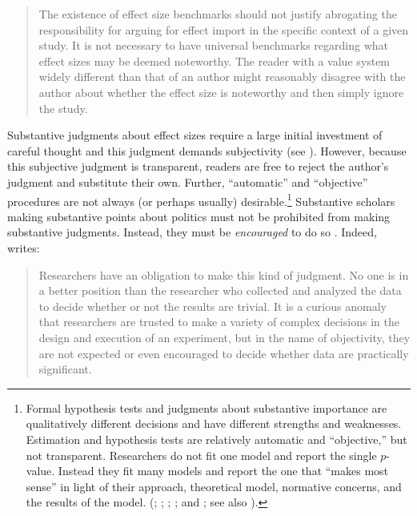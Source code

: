 \documentclass[12pt]{article}
\begin{document}
\begin{quote}
The existence of effect size benchmarks should not justify abrogating the responsibility for arguing for effect import in the specific context of a given study. It is not necessary to have universal benchmarks regarding what effect sizes may be deemed noteworthy. The reader with a value system widely different than that of an author might reasonably disagree with the author about whether the effect size is noteworthy and then simply ignore the study.
\end{quote}

Substantive judgments about effect sizes require a large initial investment of careful thought and this judgment demands subjectivity (see \citealt{Rainey2014a}). However, because this subjective judgment is transparent, readers are free to reject the author's judgment and substitute their own. Further, ``automatic'' and ``objective'' procedures are not always (or perhaps usually) desirable.\footnote{Formal hypothesis tests and judgments about substantive importance are qualitatively different decisions and have different strengths and weaknesses. Estimation and hypothesis tests are relatively automatic and ``objective,'' but not transparent. Researchers do not fit one model and report the single $p$-value. Instead they fit many models and report the one that ``makes most sense'' in light of their approach, theoretical model, normative concerns, and the results of the model. (\citealt{GerberMalhotra2008}; \citealt{SimmonsNelsonSimonsohn2011}; \citealt{Francis2013}; \citealt{SimmonsNelsonSimonsohn2014}; and \citealt{EsareyWu2014}; see also \citealt{GelmanLoken2014}).} Substantive scholars making substantive points about politics must not be prohibited from making substantive judgments. Instead, they must be \emph{encouraged} to do so \citep{Achen1982}. Indeed, \citet[p. 755]{Kirk1996} writes:

\begin{quote}
Researchers have an obligation to make this kind of judgment. No one is in a better position than the researcher who collected and analyzed the data to decide whether or not the results are trivial. It is a curious anomaly that researchers are trusted to make a variety of complex decisions in the design and execution of an experiment, but in the name of objectivity, they are not expected or even encouraged to decide whether data are practically significant.
\end{quote}
\end{document}
